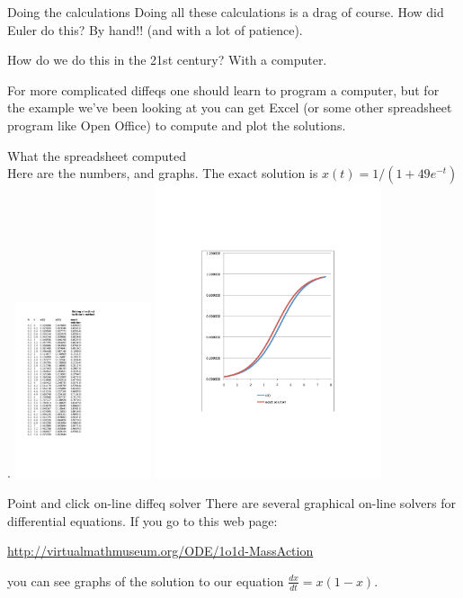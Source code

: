 \documentclass{beamer}
\begin{document}
\begin{frame}{Doing the calculations}
  Doing all these calculations is a drag of course.  How did Euler do this?
  By hand!! (and with a lot of patience).\pause

  How do we do this in the 21st century?  With a computer.\pause

  For more complicated diffeqs one should learn to program a computer, but
  for the example we've been looking at you can get Excel (or some other
  spreadsheet program like Open Office) to compute and plot the solutions.
\end{frame}
\begin{frame}{What the spreadsheet computed\\
  {\tiny Here are the numbers, and graphs.  The exact solution is $x(t) =
  1/(1+49e^{-t})$.}}
  \includegraphics[width=0.3\textwidth]{euler-output.pdf}\hfill
  \includegraphics[width=0.5\textwidth]{euler-graphs.pdf}
\end{frame}
\begin{frame}{Point and click on-line diffeq solver}
  There are several graphical on-line solvers for differential
  equations.  If you go to this web page:

  \textcolor{red}{
  \url{http://virtualmathmuseum.org/ODE/1o1d-MassAction}}

  you can see graphs of the solution to our equation
  $\frac{dx}{dt} = x(1-x)$.
\end{frame}
\end{document}
